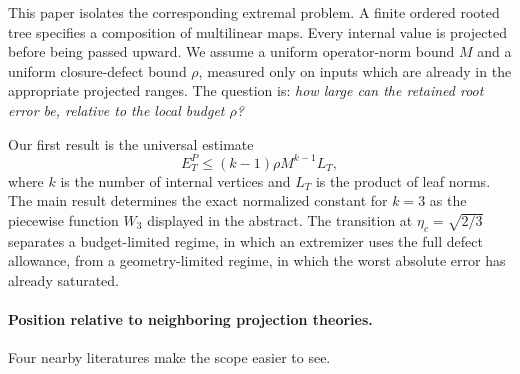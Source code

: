 \documentclass[11pt]{article}
\theoremstyle{definition}
\begin{document}
This paper isolates the corresponding extremal problem.  A finite ordered
rooted tree specifies a composition of multilinear maps.  Every internal value
is projected before being passed upward.  We assume a uniform operator-norm
bound $M$ and a uniform closure-defect bound $\rho$, measured only on inputs
which are already in the appropriate projected ranges.  The question is:
\emph{how large can the retained root error be, relative to the local budget
$\rho$?}

Our first result is the universal estimate
\begin{equation}\label{eq:intro-universal}
 E_T^P\le (k-1)\rho M^{k-1}L_T,
\end{equation}
where $k$ is the number of internal vertices and $L_T$ is the product of leaf
norms.  The main result determines the exact normalized constant for $k=3$ as
the piecewise function $W_3$ displayed in the abstract.  The transition at
$\eta_c=\sqrt{2/3}$ separates a budget-limited regime, in which an extremizer
uses the full defect allowance, from a geometry-limited regime, in which the
worst absolute error has already saturated.

\paragraph{Position relative to neighboring projection theories.}
Four nearby literatures make the scope easier to see.
\end{document}
